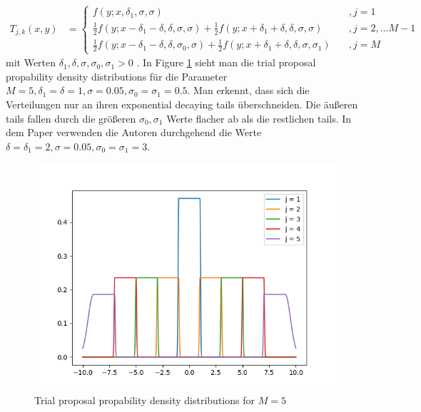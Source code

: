 \documentclass{scrartcl}
\begin{document}
    \begin{align*}
        T_{j,k}(x,y)&=\begin{cases}
                          f(y;x,\delta_1,\sigma,\sigma)&\quad,j=1\\
                          \frac 12 f(y;x-\delta_1-\delta,\delta,\sigma,\sigma)+\frac 12 f(y;x+\delta_1+\delta,\delta,\sigma,\sigma)&\quad,j=2,\dots M-1\\
                          \frac 12 f(y;x-\delta_1-\delta,\delta,\sigma_0,\sigma)+\frac 12 f(y;x+\delta_1+\delta,\delta,\sigma,\sigma_1)&\quad,j=M
        \end{cases}
    \end{align*}
    mit Werten $\delta_1,\delta,\sigma,\sigma_0,\sigma_1>0$ \cite{lau2019}. In Figure \ref{trial_proposals}
    sieht man die trial proposal propability density distributions für die Parameter $M=5, \delta_1=\delta=1,\sigma=0.05,\sigma_0=\sigma_1=0.5$. Man erkennt, dass sich die
    Verteilungen nur an ihren exponential decaying tails überschneiden. Die äußeren tails fallen durch die größeren $\sigma_0, \sigma_1$ Werte
    flacher ab als die restlichen tails. In dem Paper \cite{lau2019} verwenden die Autoren durchgehend die Werte $\delta=\delta_1=2,\sigma=0.05,\sigma_0=\sigma_1=3$.

    \begin{figure}
        \centering
        \includegraphics[scale=0.6]{../figs/fig_2b.png}
        \caption{Trial proposal propability density distributions for $M=5$}
        \label{trial_proposals}
    \end{figure}
\end{document}
